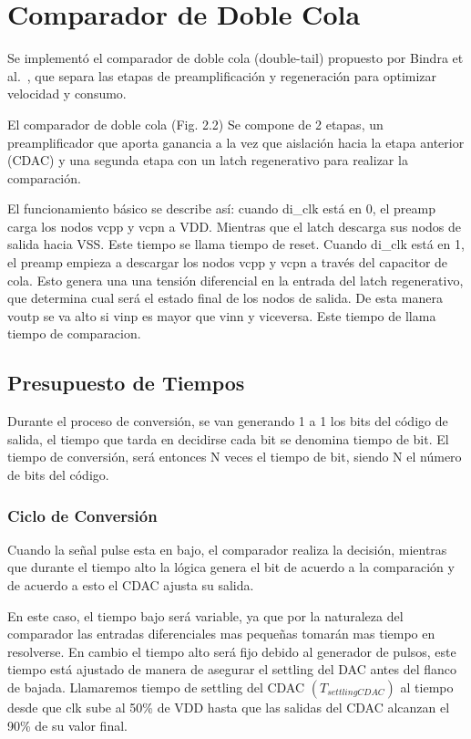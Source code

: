 \documentclass[12pt,a4paper]{report}
\begin{document}

\newpage

\section{Comparador de Doble Cola}

Se implementó el comparador de doble cola (double-tail) propuesto por Bindra et al.~\cite{bindra_comparator}, que separa las etapas de preamplificación y regeneración para optimizar velocidad y consumo.


El comparador de doble cola (Fig. 2.2) Se compone de 2 etapas, un preamplificador que aporta ganancia a la vez que aislación hacia la etapa anterior (CDAC) y una segunda etapa con un latch regenerativo para realizar la comparación. 


El funcionamiento básico se describe así: cuando di\_clk está en 0, el preamp carga los nodos vcpp y vcpn a VDD. Mientras que el latch descarga sus nodos de salida hacia VSS. Este tiempo se llama tiempo de reset.
Cuando di\_clk está en 1, el preamp empieza a descargar los nodos vcpp y vcpn a través del capacitor de cola. Esto genera una una tensión diferencial en la entrada del latch regenerativo, que determina cual será el estado final de los nodos de salida. De esta manera voutp se va alto si vinp es mayor que vinn y viceversa. Este tiempo de llama tiempo de comparacion.

\subsection{Presupuesto de Tiempos}
Durante el proceso de conversión, se van generando 1 a 1 los bits del código de salida, el tiempo que tarda en decidirse cada bit se denomina tiempo de bit. El tiempo de conversión, será entonces N veces el tiempo de bit, siendo N el número de bits del código.

\subsubsection{Ciclo de Conversión}

Cuando la señal pulse esta en bajo, el comparador realiza la decisión, mientras que durante el tiempo alto la lógica genera el bit de acuerdo a la comparación y de acuerdo a esto el CDAC ajusta su salida. 

En este caso, el tiempo bajo será variable, ya que por la naturaleza del comparador las entradas diferenciales mas pequeñas tomarán mas tiempo en resolverse. En cambio el tiempo alto será fijo debido al generador de pulsos, este tiempo está ajustado de manera de asegurar el settling del DAC antes del flanco de bajada. 
Llamaremos tiempo de settling del CDAC $(T_{settlingCDAC} )$ al tiempo desde que clk sube al 50\% de VDD hasta que las salidas del CDAC alcanzan el 90\% de su valor final. 
\end{document}

